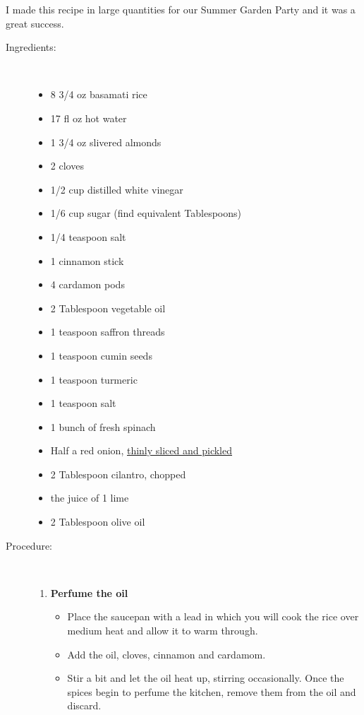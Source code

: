 \documentclass[11pt,letterpaper]{article}
\begin{document}


I made this recipe in large quantities for our Summer Garden Party and it was a great success.


\begin{description}

\item[Ingredients:]\ \\
	\begin{itemize}
	\item	 8 3/4 oz basamati rice
	\item 17 fl oz hot water
	\item 1 3/4 oz slivered almonds
	\item 2 cloves
	\item 1/2 cup distilled white vinegar
	\item 1/6 cup sugar (find equivalent Tablespoons)
	\item 1/4 teaspoon salt
	\item 1 cinnamon stick
	\item 4 cardamon pods
	\item 2 Tablespoon vegetable oil
	\item 1 teaspoon saffron threads
	\item 1 teaspoon cumin seeds
	\item 1 teaspoon turmeric
	\item 1 teaspoon salt
	\item 1 bunch of fresh spinach
	\item Half a red onion, \href{PickledRedOnions.html}{thinly sliced and pickled}
	\item 2 Tablespoon cilantro, chopped
	\item the juice of 1 lime
	\item 2 Tablespoon olive oil
	\end{itemize}

\item[Procedure:]\ \\

	\begin{enumerate}
	\item {\bf Perfume the oil}
	\begin{itemize}
	\item Place the saucepan with a lead in which you will cook the rice over medium heat and allow it to warm through. 
	\item Add the oil, cloves, cinnamon and cardamom. 
	\item Stir a bit and let the oil heat up, stirring occasionally. Once the spices begin to perfume the kitchen, remove them from the oil and discard.
	\end{itemize}
	

\end{enumerate}
\end{description}
\end{document}
